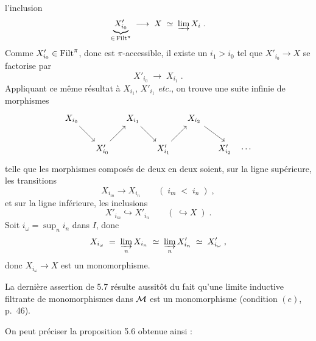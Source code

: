 \dgrchunkbegin

\clearpage


l'inclusion
\[
\underbrace{X'_{i_0}}_{\in\, \mathrm{Filt}^\pi} \;\longrightarrow\; X \;\simeq\; \varinjlim X_i \;.
\]
Comme $X'_{i_0} \in \mathrm{Filt}^\pi$, donc est $\pi$-accessible, il existe un $i_1 > i_0$ tel que $X'_{i_0} \longrightarrow X$ se factorise par
\[
X'_{i_0} \;\longrightarrow\; X_{i_1} \;.
\]
Appliquant ce même résultat à $X_{i_1}$, $X'_{i_1}$ \textit{etc.}, on trouve une suite infinie de morphismes
\[
\begin{tikzcd}[column sep=small]
X_{i_0} \arrow[dr] & & X_{i_1} \arrow[dr] & & X_{i_2} \arrow[dr] & \\
& X'_{i_0} \arrow[ur] & & X'_{i_1} \arrow[ur] & & X'_{i_2} \quad \cdots
\end{tikzcd}
\]
telle que les morphismes composés de deux en deux soient, sur la ligne supérieure, les transitions
\[
X_{i_m} \longrightarrow X_{i_n} \qquad (\; i_m \;<\; i_n \;) \;,
\]
et sur la ligne inférieure, les inclusions
\[
X'_{i_m} \hookrightarrow X'_{i_n} \qquad (\; \hookrightarrow X \;) \;.
\]
Soit $i_\omega = \sup_n i_n$ dans $I$, donc
\[
X_{i_\omega} \;=\; \varinjlim_{n} X_{i_n} \;\simeq\; \varinjlim_{n} X'_{i_n} \;\simeq\; X'_{i_\omega} \;,
\]
donc $X_{i_\omega} \longrightarrow X$ est un monomorphisme.


La dernière assertion de 5.7 résulte aussitôt du fait qu'une limite inductive filtrante de monomorphismes dans $\mathcal{M}$ est un monomorphisme (condition $(e)$, p.~46).

On peut préciser la proposition 5.6 obtenue ainsi :

